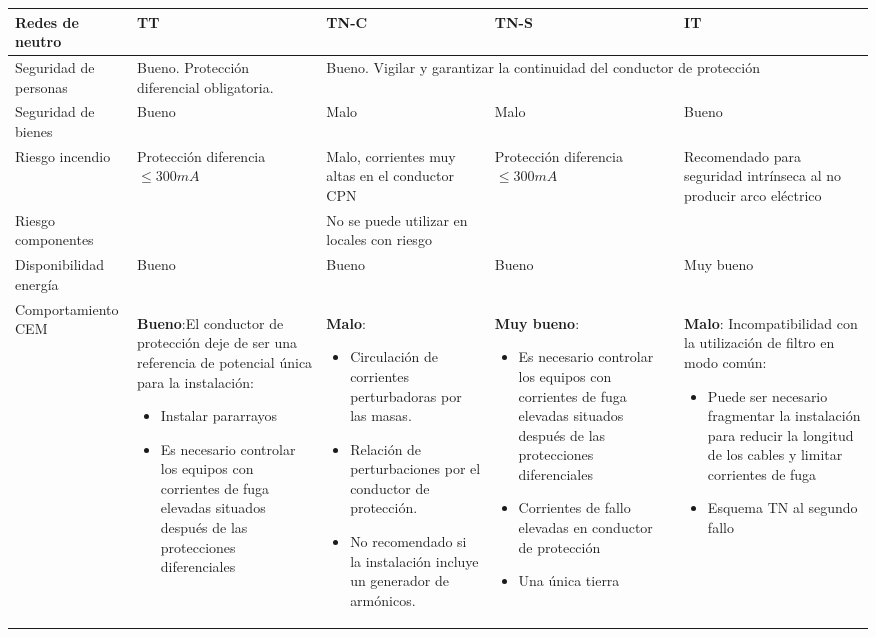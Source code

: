 \renewcommand{\arraystretch}{1.5}
\begin{center}
\begin{tabular}{|p{3cm}|p{3cm}|p{3cm}|p{3cm}|p{3cm}|}
	\hline
	Redes de neutro & TT & TN-C &TN-S & IT \\ \hline
	Seguridad de personas & Bueno. Protección diferencial obligatoria.&\multicolumn{3}{|p{9cm}|}{ Bueno. Vigilar y garantizar la continuidad del conductor de protección}\\ \hline
	Seguridad de bienes & Bueno&Malo&Malo&Bueno\\ \hline
	Riesgo incendio &Protección diferencia $\le 300 mA$&Malo, corrientes muy altas en el conductor CPN&Protección diferencia $\le 300 mA$& Recomendado para seguridad intrínseca al no producir arco eléctrico\\ \hline
	Riesgo componentes &&No se puede utilizar en locales con riesgo&&\\ \hline
	Disponibilidad energía &Bueno&Bueno&Bueno& Muy bueno\\ \hline
	Comportamiento CEM &\textbf{Bueno}:El conductor de protección deje de ser una referencia de potencial única para la instalación:\begin{itemize}
		\item Instalar pararrayos
		\item Es necesario controlar los equipos con corrientes de fuga elevadas situados después de las protecciones diferenciales
	\end{itemize} &\textbf{Malo}: 
	\begin{itemize}
		\item Circulación de corrientes perturbadoras por las masas.
		\item Relación de perturbaciones por el conductor de protección.
		\item No recomendado si la instalación incluye un generador de armónicos.
	\end{itemize}
	   &\textbf{Muy bueno}:\begin{itemize}
	\item Es necesario controlar los equipos con corrientes de fuga elevadas situados después de las protecciones diferenciales
	\item Corrientes de fallo elevadas en conductor de protección
	\item Una única tierra
	\end{itemize}&\textbf{Malo}: Incompatibilidad con la utilización de filtro en modo común:
	\begin{itemize}
		\item Puede ser necesario fragmentar la instalación para reducir la longitud de los cables y limitar corrientes de fuga
		\item Esquema TN al segundo fallo
	\end{itemize}\\ \hline
\end{tabular}
\end{center}
